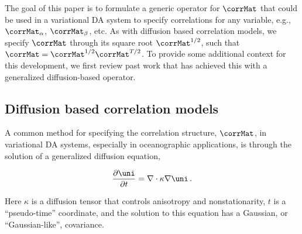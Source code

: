 \documentclass[alpha-refs]{wiley-article}
\begin{document}
The goal of this paper is to formulate a generic operator for $\corrMat$
that could be
used in a variational DA system to specify
correlations for any variable, e.g., $\corrMat_\alpha$, $\corrMat_\beta$, etc.
As with diffusion based correlation models, we specify $\corrMat$ through its
square root $\corrMat^{1/2}$, such that
$\corrMat = \corrMat^{1/2}\corrMat^{T/2}$.
To provide some additional context for this development,
we first review past work that has achieved this with a generalized
diffusion-based operator.


\subsection{Diffusion based correlation models}
\label{ssec:wc01_review}

A common method for specifying the correlation structure,
$\corrMat$, in variational DA systems, especially in
oceanographic applications, is through the solution of a generalized diffusion
equation,
\begin{linenomath*}\begin{equation}
    \dfrac{\partial \uni}{\partial t} = \nabla \cdot \kappa \nabla\uni \, .
    \label{eq:diffusion}
\end{equation}\end{linenomath*}
Here $\kappa$ is a diffusion tensor that controls anisotropy and
nonstationarity, $t$ is a ``pseudo-time'' coordinate, and the solution to this
equation has a Gaussian, or ``Gaussian-like'', covariance.
\end{document}
